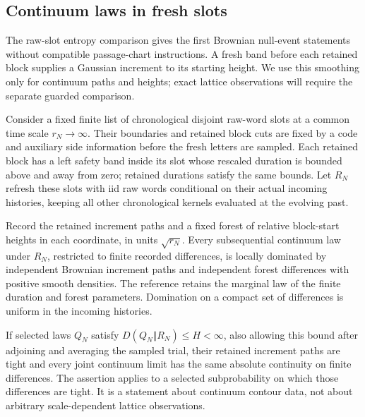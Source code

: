 \subsection{Continuum laws in fresh slots}

The raw-slot entropy comparison gives the first Brownian null-event
statements without compatible passage-chart instructions.  A fresh band
before each retained block supplies a Gaussian increment to its starting
height.  We use this smoothing only for continuum paths and heights;
exact lattice observations will require the separate guarded comparison.

\begin{lemma}
\label{view:contour-slot-transfer}
Consider a fixed finite list of chronological disjoint raw-word slots
at a common time scale $r_N\to\infty$.  Their boundaries and retained
block cuts are fixed by a code and auxiliary side information before
the fresh letters are sampled.  Each retained block has a left safety
band inside its slot whose rescaled duration is bounded above and
away from zero; retained durations satisfy the same bounds.
Let $R_N$ refresh these slots with iid raw words conditional on their
actual incoming histories, keeping all other chronological kernels
evaluated at the evolving past.

Record the retained increment paths and a fixed forest of relative
block-start heights in each coordinate, in units $\sqrt{r_N}$.
Every subsequential continuum law under $R_N$, restricted to finite
recorded differences, is locally dominated by independent Brownian
increment paths and independent forest differences with positive smooth
densities.  The reference retains the marginal law of the finite
duration and forest parameters.  Domination on a compact set of
differences is uniform in the incoming histories.

If selected laws $Q_N$ satisfy $D(Q_N\Vert R_N)\le H<\infty$,
also allowing this bound after adjoining and averaging the sampled
trial, their retained increment paths are tight and every joint
continuum limit has the same absolute continuity on finite differences.
The assertion applies to a selected subprobability on which those
differences are tight.  It is a statement about continuum contour
data, not about arbitrary scale-dependent lattice observations.
\end{lemma}

